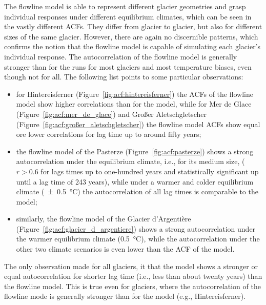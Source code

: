       The flowline model is able to represent different glacier geometries and grasp individual responses under different equilibrium climates, which can be seen in the vastly different ACFs. They differ from glacier to glacier, but also for different sizes of the same glacier. However, there are again no discernible patterns, which confirms the notion that the flowline model is capable of simulating each glacier's individual response. The autocorrelation of the flowline model is generally stronger than for the \vas{} runs for most glaciers and most temperature biases, even though not for all. The following list points to some particular observations:
      \begin{itemize}
        \item for Hintereisferner (Figure~\ref{fig:acf:hintereisferner}) the ACFs of the flowline model show higher correlations than for the \vas{} model, while for Mer de Glace (Figure~\ref{fig:acf:mer_de_glace}) and Großer Aletschgletscher (Figure~\ref{fig:acf:großer_aletschgletscher}) the flowline model ACFs show equal ore lower correlations for lag time up to around fifty years;
        \item the flowline model of the Pasterze (Figure~\ref{fig:acf:pasterze}) shows a strong autocorrelation under the equilibrium climate, i.e., for its medium size, ($r>0.6$ for lags times up to one-hundred years and statistically significant up until a lag time of 243 years), while under a warmer and colder equilibrium climate (\SI{\pm0.5}{\celsius}) the autocorrelation of all lag times is comparable to the \vas{} model;
        \item similarly, the flowline model of the Glacier d'Argentière (Figure~\ref{fig:acf:glacier_d_argentiere}) shows a strong autocorrelation under the warmer equilibrium climate (\SI{+0.5}{\celsius}), while the autocorrelation under the other two climate scenarios is even lower than the ACF of the \vas{} model.
      \end{itemize}
      The only observation made for all glaciers, it that the \vas{} model shows a stronger or equal autocorrelation for shorter lag time (i.e., less than about twenty years) than the flowline model. This is true even for glaciers, where the autocorrelation of the flowline mode is generally stronger than for the \vas{} model (e.g., Hintereisferner).

